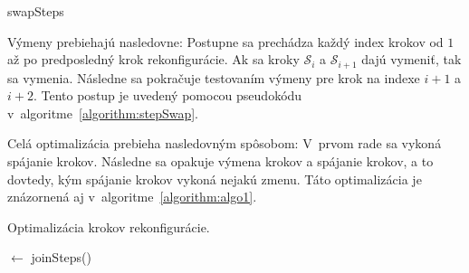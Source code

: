 \documentclass[
  printed, %
  oneside, %
  notable,   %
  nolof,     %
  nolot,     %
]{fithesis3}
\begin{document}
\begin{algorithm}
    \caption{swapSteps}
    \label{algorithm:stepSwap}
    
    \DontPrintSemicolon
    
\end{algorithm}

Výmeny prebiehajú nasledovne: Postupne sa prechádza každý index krokov od $1$ až po predposledný krok rekonfigurácie. Ak sa kroky $\mathcal{S}_i$ a $\mathcal{S}_{i + 1}$ dajú vymeniť, tak sa vymenia. Následne sa pokračuje testovaním výmeny pre krok na indexe $i + 1$ a $i + 2$. Tento postup je uvedený pomocou pseudokódu v~algoritme~\ref{algorithm:stepSwap}. 

Celá optimalizácia prebieha nasledovným spôsobom: V~prvom rade sa vykoná spájanie krokov. Následne sa opakuje výmena krokov a spájanie krokov, a to dovtedy, kým spájanie krokov vykoná nejakú zmenu. Táto optimalizácia je znázornená aj v~algoritme~\ref{algorithm:algo1}. 

\begin{algorithm}
    \caption{Optimalizácia krokov rekonfigurácie. }
    \label{algorithm:algo1}
    
    \DontPrintSemicolon
    
    \Steps $\leftarrow$ joinSteps(\Steps)\;
\end{algorithm}
\end{document}
